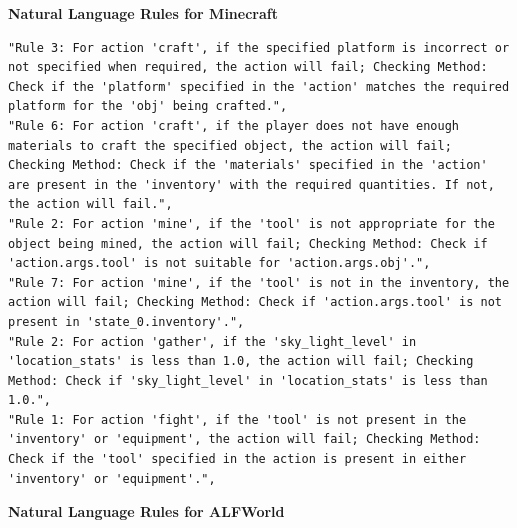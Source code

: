\documentclass{article} %
\begin{document}
\begin{center}
    \textbf{Natural Language Rules for Minecraft}
\end{center}

\lstset{language=}
\begin{lstlisting}
"Rule 3: For action 'craft', if the specified platform is incorrect or not specified when required, the action will fail; Checking Method: Check if the 'platform' specified in the 'action' matches the required platform for the 'obj' being crafted.",
"Rule 6: For action 'craft', if the player does not have enough materials to craft the specified object, the action will fail; Checking Method: Check if the 'materials' specified in the 'action' are present in the 'inventory' with the required quantities. If not, the action will fail.",
"Rule 2: For action 'mine', if the 'tool' is not appropriate for the object being mined, the action will fail; Checking Method: Check if 'action.args.tool' is not suitable for 'action.args.obj'.",
"Rule 7: For action 'mine', if the 'tool' is not in the inventory, the action will fail; Checking Method: Check if 'action.args.tool' is not present in 'state_0.inventory'.",
"Rule 2: For action 'gather', if the 'sky_light_level' in 'location_stats' is less than 1.0, the action will fail; Checking Method: Check if 'sky_light_level' in 'location_stats' is less than 1.0.",
"Rule 1: For action 'fight', if the 'tool' is not present in the 'inventory' or 'equipment', the action will fail; Checking Method: Check if the 'tool' specified in the action is present in either 'inventory' or 'equipment'.",
\end{lstlisting}



\begin{center}
    \textbf{Natural Language Rules for ALFWorld}
\end{center}
\end{document}

